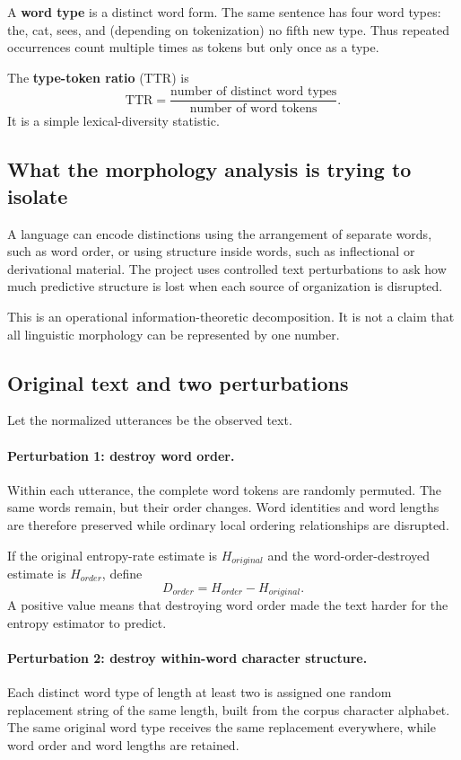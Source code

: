 \documentclass[11pt]{article}
\begin{document}
A \textbf{word type} is a distinct word form. The same sentence has four word types: the, cat, sees, and (depending on tokenization) no fifth new type. Thus repeated occurrences count multiple times as tokens but only once as a type.

The \textbf{type-token ratio} (TTR) is
\[
\mathrm{TTR}=\frac{\text{number of distinct word types}}{\text{number of word tokens}}.
\]
It is a simple lexical-diversity statistic.

\subsection{What the morphology analysis is trying to isolate}
A language can encode distinctions using the arrangement of separate words, such as word order, or using structure inside words, such as inflectional or derivational material. The project uses controlled text perturbations to ask how much predictive structure is lost when each source of organization is disrupted.

This is an operational information-theoretic decomposition. It is not a claim that all linguistic morphology can be represented by one number.

\subsection{Original text and two perturbations}
Let the normalized utterances be the observed text.

\paragraph{Perturbation 1: destroy word order.}
Within each utterance, the complete word tokens are randomly permuted. The same words remain, but their order changes. Word identities and word lengths are therefore preserved while ordinary local ordering relationships are disrupted.

If the original entropy-rate estimate is $H_{original}$ and the word-order-destroyed estimate is $H_{order}$, define
\[
\boxed{D_{order}=H_{order}-H_{original}.}
\]
A positive value means that destroying word order made the text harder for the entropy estimator to predict.

\paragraph{Perturbation 2: destroy within-word character structure.}
Each distinct word type of length at least two is assigned one random replacement string of the same length, built from the corpus character alphabet. The same original word type receives the same replacement everywhere, while word order and word lengths are retained.
\end{document}

